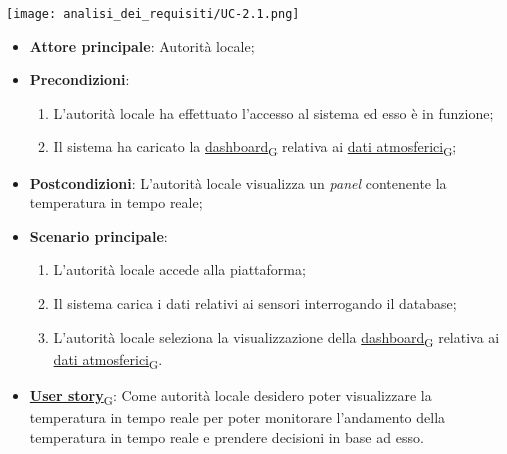 \begin{center}
	\texttt{[image: analisi\_dei\_requisiti/UC-2.1.png]}
\end{center}
\begin{itemize}
	\item \textbf{Attore principale}: Autorità locale;
	\item \textbf{Precondizioni}:
	      \begin{enumerate}
		      \item L'autorità locale ha effettuato l'accesso al sistema ed esso è in funzione;
		      \item Il sistema ha caricato la \href{https://7last.github.io/docs/rtb/documentazione-interna/glossario\#dashboard}{dashboard\textsubscript{G}} relativa ai \href{https://7last.github.io/docs/rtb/documentazione-interna/glossario\#dati-atmosferici}{dati atmosferici\textsubscript{G}};
	      \end{enumerate}
	\item \textbf{Postcondizioni}: L'autorità locale visualizza un \textit{panel} contenente la temperatura in tempo reale;
	\item \textbf{Scenario principale}:
	      \begin{enumerate}
		      \item L'autorità locale accede alla piattaforma;
		      \item Il sistema carica i dati relativi ai sensori interrogando il database;
		      \item L'autorità locale seleziona la visualizzazione della \href{https://7last.github.io/docs/rtb/documentazione-interna/glossario\#dashboard}{dashboard\textsubscript{G}} relativa ai \href{https://7last.github.io/docs/rtb/documentazione-interna/glossario\#dati-atmosferici}{dati atmosferici\textsubscript{G}}.
	      \end{enumerate}
	\item \href{https://7last.github.io/docs/rtb/documentazione-interna/glossario\#user-story}{\textbf{User story}\textsubscript{G}}: Come autorità locale desidero poter visualizzare la temperatura in tempo reale per poter monitorare
	      l'andamento della temperatura in tempo reale e prendere decisioni in base ad esso.
\end{itemize}

